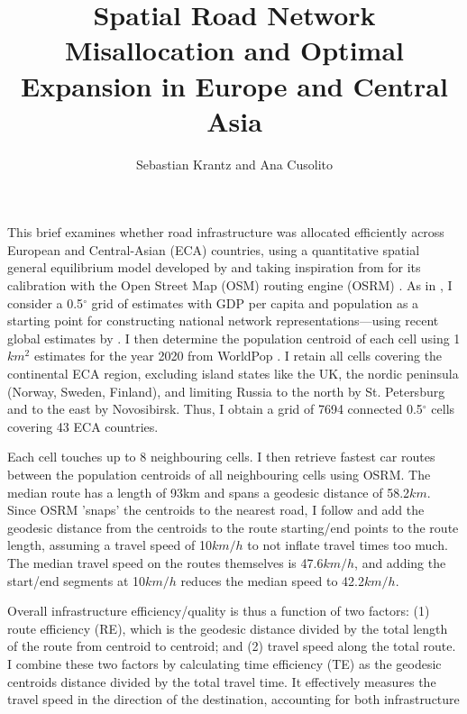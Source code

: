 \documentclass[a4paper]{article}
\title{\textbf{Spatial Road Network Misallocation and Optimal Expansion in Europe and Central Asia}}
\author{Sebastian Krantz and Ana Cusolito}
\begin{document}
\maketitle

This brief examines whether road infrastructure was allocated efficiently across European and Central-Asian (ECA) countries, using a quantitative spatial general equilibrium model developed by \citet{fajgelbaum2020optimal} and taking inspiration from \citet{graff2024spatial} for its calibration with the Open Street Map (OSM) routing engine (OSRM) \citep{luxen-vetter-2011}. As in \citet{fajgelbaum2020optimal}, I consider a 0.5$^\circ$ grid of estimates with GDP per capita and population as a starting point for constructing national network representations---using recent global estimates by \citet{LGEAW}. I then determine the population centroid of each cell using 1$km^2$ estimates for the year 2020 from WorldPop \citep{tatem2017worldpop}. I retain all cells covering the continental ECA region, excluding island states like the UK, the nordic peninsula (Norway, Sweden, Finland), and limiting Russia to the north by St. Petersburg and to the east by Novosibirsk. Thus, I obtain a grid of 7694 connected 0.5$^\circ$ cells covering 43 ECA countries. \newline 

Each cell touches up to 8 neighbouring cells. I then retrieve fastest car routes between the population centroids of all neighbouring cells using OSRM. The median route has a length of 93km and spans a geodesic distance of 58.2$km$. Since OSRM 'snaps' the centroids to the nearest road, I follow \citet{graff2024spatial} and add the geodesic distance from the centroids to the route starting/end points to the route length, assuming a travel speed of 10$km/h$ to not inflate travel times too much. The median travel speed on the routes themselves is 47.6$km/h$, and adding the start/end segments at 10$km/h$ reduces the median speed to 42.2$km/h$. \newline 

 Overall infrastructure efficiency/quality is thus a function of two factors: (1) route efficiency (RE), which is the geodesic distance divided by the total length of the route from centroid to centroid; and (2) travel speed along the total route. I combine these two factors by calculating time efficiency (TE) as the geodesic centroids distance divided by the total travel time. It effectively measures the travel speed in the direction of the destination, accounting for both infrastructure 
 
\end{document}
